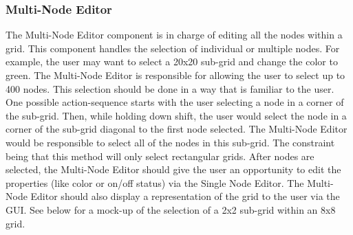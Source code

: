 \documentclass[12pt]{article}
\begin{document}
	\subsubsection {Multi-Node Editor}
  	The Multi-Node Editor component is in charge of editing all the nodes within a grid. This component handles the selection of individual or multiple nodes. For example, the user may want to select a 20x20 sub-grid and change the color to green. The Multi-Node Editor is responsible for allowing the user to select up to 400 nodes. 
    This selection should be done in a way that is familiar to the user. One possible action-sequence starts with the user selecting a node in a corner of the sub-grid. Then, while holding down shift, the user would select the node in a corner of the sub-grid diagonal to the first node selected. The Multi-Node Editor would be responsible to select all of the nodes in this sub-grid. The constraint being that this method will only select rectangular grids.	
  	After nodes are selected, the Multi-Node Editor should give the user an opportunity to edit the properties (like color or on/off status) via the Single Node Editor.   	
  	The Multi-Node Editor should also display a representation of the grid to the user via the GUI. See below for a mock-up of the selection of a 2x2 sub-grid within an 8x8 grid.
	
\end{document}
